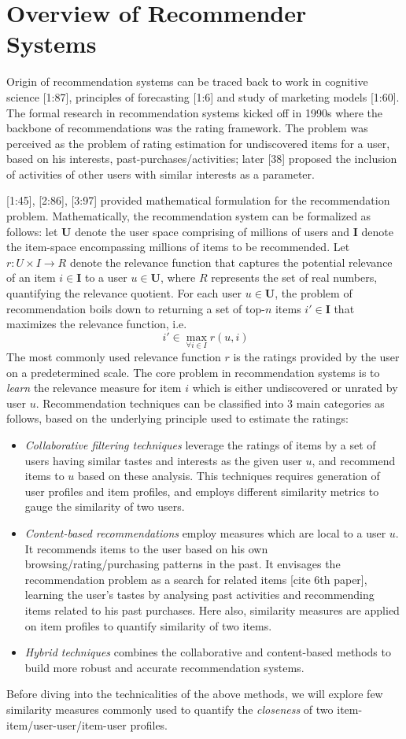 \section{Overview of Recommender Systems}
Origin of recommendation systems can be traced back to work in cognitive science [1:87], principles of forecasting [1:6] and study of marketing models [1:60]. The formal research in recommendation systems kicked off in 1990s where the backbone of recommendations was the rating framework. The problem was perceived as the problem of rating estimation for undiscovered items for a user, based on his interests, past-purchases/activities; later [38] proposed the inclusion of activities of other users with similar interests as a parameter.

[1:45], [2:86], [3:97] provided mathematical formulation for the recommendation problem. Mathematically, the recommendation system can be formalized as follows: let $\textbf{U}$ denote the user space comprising of millions of users and $\textbf{I}$ denote the item-space encompassing millions of items to be recommended. Let $r:U\times I\rightarrow R$ denote the relevance function that captures the potential relevance of an item $i\in \textbf{I}$ to a user $u\in \textbf{U}$, where $R$ represents the set of real numbers, quantifying the relevance quotient. For each user $u\in \textbf{U}$, the problem of recommendation boils down to returning a set of top-$n$ items $i'\in \textbf{I}$ that maximizes the relevance function, i.e.
\begin{equation}
~i'\in\max_{\forall i\in I}r(u,i)
\end{equation}
The most commonly used relevance function $r$ is the ratings provided by the user on a predetermined scale. The core problem in recommendation systems is to \textit{learn} the relevance measure for item $i$ which is either undiscovered or unrated by user $u$. Recommendation techniques can be classified into 3 main categories as follows, based on the underlying principle used to estimate the ratings:
\begin{itemize}
\item \textit{Collaborative filtering techniques} leverage the ratings of items by a set of users having similar tastes and interests as the given user $u$, and recommend items to $u$ based on these analysis. This techniques requires generation of user profiles and item profiles, and employs different similarity metrics to gauge the similarity of two users. 
\item \textit{Content-based recommendations} employ measures which are local to a user $u$. It recommends items to the user based on his own browsing/rating/purchasing patterns in the past. It envisages the recommendation problem as a search for related items [cite 6th paper], learning the user's tastes by analysing past activities and recommending items related to his past purchases. Here also, similarity measures are applied on item profiles to quantify similarity of two items.
\item \textit{Hybrid techniques} combines the collaborative and content-based methods to build more robust and accurate recommendation systems.
\end{itemize}
Before diving into the technicalities of the above methods, we will explore few similarity measures commonly used to quantify the \textit{closeness} of two item-item/user-user/item-user profiles.
